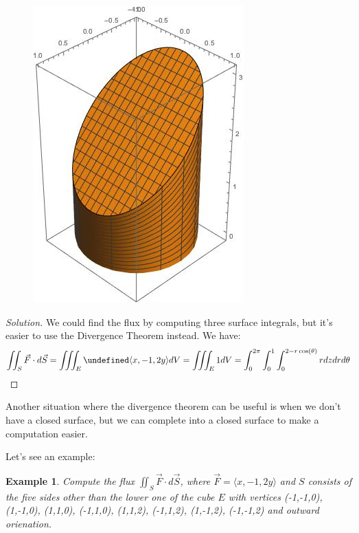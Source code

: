 \documentclass[12pt]{article}
\newcommand{\vF}{\vec{F}}
\renewcommand{\lg}{\langle}
\newcommand{\rg}{\rangle}
\newcommand{\vS}{\vec{S}}
\newcommand{\flux}{\iint_S \vF\cdot d\vS}
\let \div \undefined
\DeclareMathOperator{\div}{div}
\newenvironment{solution}
  {\begin{proof}[Solution]}
  {\end{proof}
  
  }
\newtheorem{example}{Example}
\begin{document}
\begin{enumerate}
\begin{figure}[h]
\begin{center}
\includegraphics[scale=.3]{cylinder.jpeg}
\end{center}
\end{figure}
\begin{solution}
We could find the flux by computing three surface integrals, but it's easier to use the Divergence Theorem instead. We have:
$$\flux=\iiint_E \div\lg x,-1,2y\rg dV=\iiint_E 1 dV=\int_0^{2\pi}\int _0^1\int_0^{2-r\cos(\theta)}rdzdrd\theta$$
\end{solution}

Another situation where the divergence theorem can be useful is when we don't have a closed surface, but we can complete into a closed surface to make a computation easier.

Let's see an example:

\begin{example}
Compute the flux $\flux$, where $\vF=\lg x,-1,2y\rg $ and $S$ consists of the five sides other than the lower one of the cube $E$ with vertices (-1,-1,0), (1,-1,0), (1,1,0), (-1,1,0), (1,1,2), (-1,1,2), (1,-1,2), (-1,-1,2) and outward orienation.
\end{example}


\end{enumerate}
\end{document}
